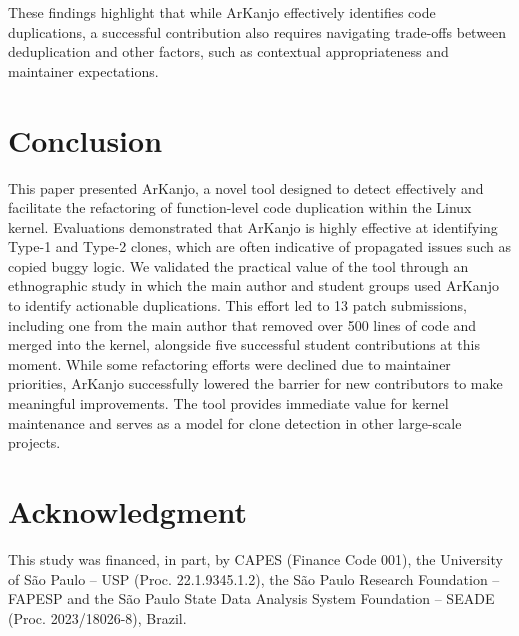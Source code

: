\documentclass[conference]{IEEEtran}
\begin{document}
These findings highlight that while ArKanjo effectively identifies code duplications, a successful 
contribution also requires navigating trade-offs between deduplication and other factors, such as 
contextual appropriateness and maintainer expectations.


\section{Conclusion}

This paper presented ArKanjo, a novel tool designed to detect effectively 
and facilitate the refactoring of function-level code duplication within the Linux kernel. 
Evaluations demonstrated that ArKanjo is highly effective at identifying Type-1 and Type-2 
clones, which are often indicative of propagated issues such as copied buggy logic. We validated the practical 
value of the tool through an ethnographic study in which the main author and student 
groups used ArKanjo to identify actionable duplications. This effort led to 13 patch 
submissions, including one from the main author that removed over 500 lines of code and merged 
into the kernel, alongside five successful student contributions at this moment. While some refactoring 
efforts were declined due to maintainer priorities, ArKanjo successfully lowered the barrier 
for new contributors to make meaningful improvements. The tool provides immediate value for 
kernel maintenance and serves as a model for clone detection in other large-scale projects.

\section*{Acknowledgment}

This study was financed, in part, by CAPES (Finance Code 001), the University of São Paulo – USP (Proc. 22.1.9345.1.2), the São Paulo Research Foundation – FAPESP and the São Paulo State Data Analysis System Foundation – SEADE (Proc. 2023/18026-8), Brazil.

\newpage


\end{document}
